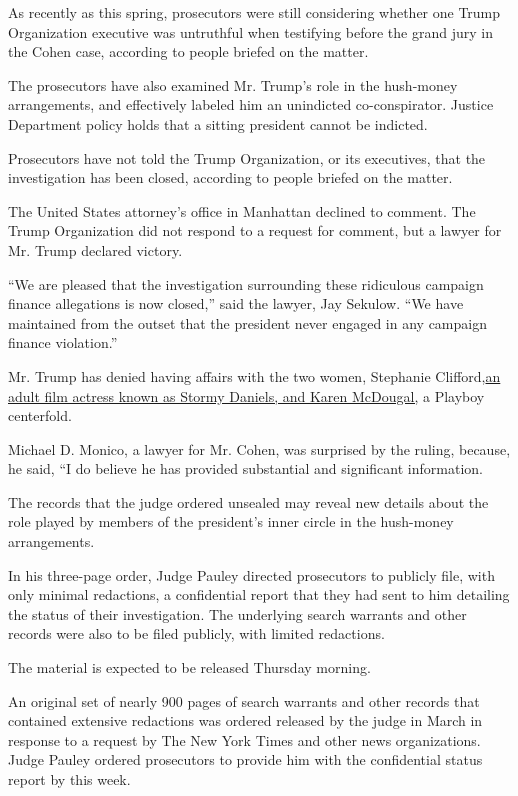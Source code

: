 As recently as this spring, prosecutors were still considering whether
one Trump Organization executive was untruthful when testifying before
the grand jury in the Cohen case, according to people briefed on the
matter.

The prosecutors have also examined Mr. Trump's role in the hush-money
arrangements, and effectively labeled him an unindicted co-conspirator.
Justice Department policy holds that a sitting president cannot be
indicted.

Prosecutors have not told the Trump Organization, or its executives,
that the investigation has been closed, according to people briefed on
the matter.

The United States attorney's office in Manhattan declined to comment.
The Trump Organization did not respond to a request for comment, but a
lawyer for Mr. Trump declared victory.

``We are pleased that the investigation surrounding these ridiculous
campaign finance allegations is now closed,'' said the lawyer, Jay
Sekulow. ``We have maintained from the outset that the president never
engaged in any campaign finance violation.''

Mr. Trump has denied having affairs with the two women, Stephanie
Clifford,\href{https://www.nytimes.com/2018/05/04/us/politics/trump-hush-payment-stormy-daniels.html}{an
adult film actress known as Stormy Daniels, and Karen McDougal,} a
Playboy centerfold.

Michael D. Monico, a lawyer for Mr. Cohen, was surprised by the ruling,
because, he said, ``I do believe he has provided substantial and
significant information.

The records that the judge ordered unsealed may reveal new details about
the role played by members of the president's inner circle in the
hush-money arrangements.

In his three-page order, Judge Pauley directed prosecutors to publicly
file, with only minimal redactions, a confidential report that they had
sent to him detailing the status of their investigation. The underlying
search warrants and other records were also to be filed publicly, with
limited redactions.

The material is expected to be released Thursday morning.

An original set of nearly 900 pages of search warrants and other records
that contained extensive redactions was ordered released by the judge in
March in response to a request by The New York Times and other news
organizations. Judge Pauley ordered prosecutors to provide him with the
confidential status report by this week.

